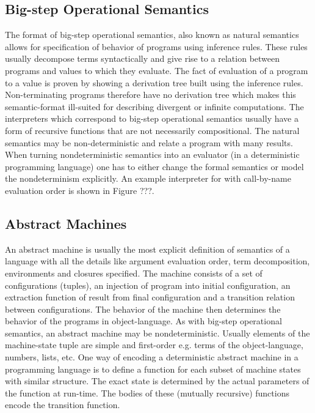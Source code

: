 \subsection*{Big-step Operational Semantics}
The format of big-step operational semantics, also known as natural semantics allows for specification of behavior of programs using inference rules.
These rules usually decompose terms syntactically and give rise to a relation between programs and values to which they evaluate.
The fact of evaluation of a program to a value is proven by showing a derivation tree built using the inference rules.
Non-terminating programs therefore have no derivation tree which makes this semantic-format ill-suited for describing divergent or infinite computations.
The interpreters which correspond to big-step operational semantics usually have a form of recursive functions that are not necessarily compositional.
The natural semantics may be non-deterministic and relate a program with many results.
When turning nondeterministic semantics into an evaluator (in a deterministic programming language) one has to either change the formal semantics or model the nondeterminism explicitly.
An example interpreter for \LC{} with call-by-name evaluation order is shown in Figure ???.


\subsection*{Abstract Machines}
An abstract machine is usually the most explicit definition of semantics of a language with all the details like argument evaluation order, term decomposition, environments and closures specified.
The machine consists of a set of configurations (tuples), an injection of program into initial configuration, an extraction function of result from final configuration and a transition relation between configurations.
The behavior of the machine then determines the behavior of the programs in object-language.
As with big-step operational semantics, an abstract machine may be nondeterministic.
Usually elements of the machine-state tuple are simple and first-order e.g. terms of the object-language, numbers, lists, etc.
One way of encoding a deterministic abstract machine in a programming language is to define a function for each subset of machine states with similar structure.
The exact state is determined by the actual parameters of the function at run-time.
The bodies of these (mutually recursive) functions encode the transition function.